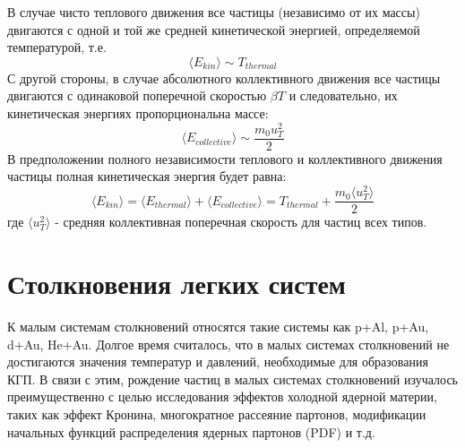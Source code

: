 

В случае чисто теплового движения все частицы (независимо от их массы) двигаются с одной и той же средней кинетической энергией, определяемой температурой, т.е.
$$\langle E_{kin} \rangle \sim T_{thermal}$$
С другой стороны, в случае абсолютного коллективного движения все частицы двигаются с одинаковой поперечной скоростью $\beta{T}$ и следовательно, их кинетическая энергиях пропорциональна массе:
$$\langle E_{collective} \rangle \sim \frac{m_0 u_T ^2}{2} $$
В предположении полного независимости теплового и коллективного движения частицы полная кинетическая энергия будет равна:
$$ \langle E_{kin} \rangle = \langle E_{thermal} \rangle + \langle E_{collective} \rangle = T_{thermal}+\frac{m_0 \langle u_T ^2 \rangle }{2}$$
где $ \langle u_T ^2 \rangle$ - средняя коллективная поперечная скорость для частиц всех типов. 



\section{Столкновения легких систем}

К малым системам столкновений относятся такие системы как p+Al, p+Au, d+Au, He+Au. Долгое время считалось, что в малых системах столкновений не достигаются значения температур и давлений, необходимые для образования КГП. В связи с этим, рождение частиц в малых системах столкновений изучалось преимущественно с целью исследования эффектов холодной ядерной материи, таких как эффект Кронина, многократное рассеяние партонов, модификации начальных функций распределения ядерных партонов (PDF) и т.д.

